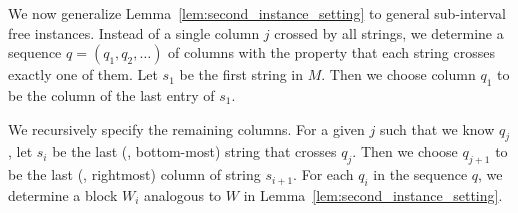 %
%
%
%
%
    We now generalize Lemma~\ref{lem:second_instance_setting} to general sub-interval free instances.
    Instead of a single column $j$ crossed by all strings, we determine a sequence $q = (q_1,q_2,\dotsc)$ of columns with the property that each string crosses exactly one of them.
    Let $s_1$ be the first string in $M$.
    Then we choose column $q_1$ to be the column of the last entry of $s_1$.
 
    We recursively specify the remaining columns.
    For a given $j$ such that we know $q_j$, let $s_i$ be the last (\ie, bottom-most) string that crosses $q_j$.
    Then we choose $q_{j+1}$ to be the last (\ie, rightmost) column of string $s_{i+1}$.
    For each $q_i$ in the sequence $q$, we determine a block $W_i$ analogous to $W$ in Lemma~\ref{lem:second_instance_setting}.
    
